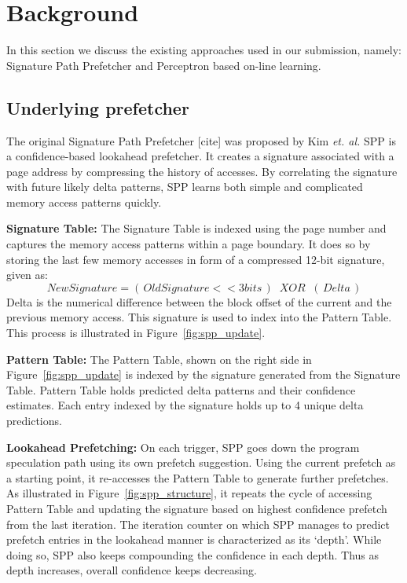\section{Background}
\label{Background}
In this section we discuss the existing approaches used in our submission, 
namely: Signature Path Prefetcher and Perceptron based on-line learning.

\subsection{Underlying prefetcher}
\label{sec:Background-SPP}
The original Signature Path Prefetcher [cite] was proposed by Kim 
{\em et. al.} SPP is a confidence-based lookahead prefetcher. 
It creates a signature associated with a page address by compressing 
the history of accesses. By correlating the signature with future 
likely delta patterns, SPP learns both simple and complicated 
memory access patterns quickly.

\noindent \textbf{Signature Table:} 
The Signature Table is indexed using the page number and captures the memory 
access patterns within a page boundary. It does so by storing the last few
memory accesses in form of a compressed 12-bit signature, given as:
$$New Signature = (\,Old Signature << 3 bits\,) \;\;XOR\;\; (\,Delta\,)$$ 
Delta is the numerical difference between the block offset of the current 
and the previous memory access. This signature is used to index into the 
Pattern Table. This process is illustrated in Figure~\ref{fig:spp_update}.

\noindent \textbf{Pattern Table:} The Pattern Table, shown on the right
side in Figure~\ref{fig:spp_update} is indexed by the signature
generated from the Signature Table.  Pattern Table holds predicted
delta patterns and their confidence estimates. Each entry indexed by
the signature holds up to 4 unique delta predictions.

\noindent \textbf{Lookahead Prefetching:} On each trigger, SPP goes
down the program speculation path using its own prefetch suggestion.
Using the current prefetch as a starting point, it re-accesses the Pattern
Table to generate further prefetches.  As illustrated in
Figure~\ref{fig:spp_structure}, it repeats the cycle of accessing
Pattern Table and updating the signature based on highest confidence
prefetch from the last iteration.  The iteration counter on which SPP
manages to predict prefetch entries in the lookahead manner is
characterized as its `depth'. While doing so, SPP also keeps
compounding the confidence in each depth. Thus as depth increases,
overall confidence keeps decreasing.

